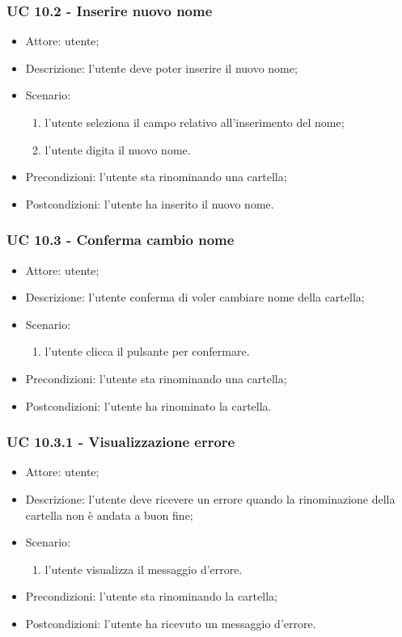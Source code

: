     \subsubsection{UC 10.2 - Inserire nuovo nome} \label{sec: UC 10.2}
    \begin{itemize}
        \item Attore: utente;
        \item Descrizione: l'utente deve poter inserire il nuovo nome;
        \item Scenario:
        \begin{enumerate}
        \item l'utente seleziona il campo relativo all'inserimento del nome;
        \item l'utente digita il nuovo nome.
        \end{enumerate}
        \item Precondizioni: l'utente sta rinominando una cartella;
        \item Postcondizioni: l'utente ha inserito il nuovo nome.
    \end{itemize}
    \subsubsection{UC 10.3 - Conferma cambio nome} \label{sec: UC 10.3}
    \begin{itemize}
        \item Attore: utente;
        \item Descrizione: l'utente conferma di voler cambiare nome della cartella;
        \item Scenario:
        \begin{enumerate}
        \item l'utente clicca il pulsante per confermare.
        \end{enumerate}
        \item Precondizioni: l'utente sta rinominando una cartella;
        \item Postcondizioni: l'utente ha rinominato la cartella.
    \end{itemize}
    \subsubsection{UC 10.3.1 - Visualizzazione errore } \label{sec: UC 10.3.1}
    \begin{itemize}
        \item Attore: utente;
        \item Descrizione: l'utente deve ricevere un errore quando la rinominazione della cartella non è andata a buon fine;
        \item Scenario:
        \begin{enumerate}
        \item l'utente visualizza il messaggio d'errore.
        \end{enumerate}   
        \item Precondizioni: l'utente sta rinominando la cartella;
        \item Postcondizioni: l'utente ha ricevuto un messaggio d'errore.
    \end{itemize}

